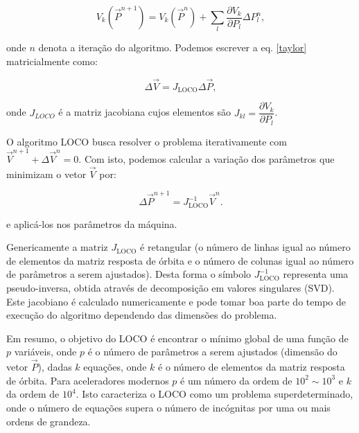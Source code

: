 \begin{equation}
V_{k}(\vec{P}^{n+1}) = V_{k}(\vec{P}^{n}) + \sum_{l}\dfrac{\partial V_{k}}{\partial P_{l}} \Delta P_{l}^{n},
\label{taylor}
\end{equation}

onde $n$ denota a iteração do algoritmo. Podemos escrever a eq. \eqref{taylor} matricialmente como:

\begin{equation}
    \Delta \vec{V}  = J_{\mathrm{LOCO}} \Delta \vec{P},
\end{equation}

onde $J_{LOCO}$ é a matriz jacobiana cujos elementos são $J_{kl} = \dfrac{\partial V_{k}}{\partial P_{l}}$.

O algoritmo LOCO busca resolver o problema iterativamente com $\vec{V}^{n+1} + \Delta \vec{V}^n = 0$. Com isto, podemos calcular a variação dos parâmetros que minimizam o vetor $\vec{V}$ por:

\begin{equation}
    \Delta \vec{P}^{n+1} = J_{\mathrm{LOCO}}^{-1} \vec{V}^{n}.
\end{equation}

e aplicá-los nos parâmetros da máquina. 

Genericamente a matriz $J_{\mathrm{LOCO}}$ é retangular (o número de linhas igual ao número de elementos da matriz resposta de órbita e o número de colunas igual ao número de parâmetros a serem ajustados). Desta forma o símbolo $J_{\mathrm{LOCO}}^{-1}$ representa uma pseudo-inversa, obtida através de decomposição em valores singulares (SVD). Este jacobiano é calculado numericamente e pode tomar boa parte do tempo de execução do algoritmo dependendo das dimensões do problema.

Em resumo, o objetivo do LOCO é encontrar o mínimo global de uma função de $p$ variáveis, onde $p$ é o número de parâmetros a serem ajustados (dimensão do vetor $\vec{P}$), dadas $k$ equações, onde $k$ é o número de elementos da matriz resposta de órbita. Para aceleradores modernos $p$ é um número da ordem de $10^{2} \sim 10^{3}$ e $k$ da ordem de $10^4$. Isto caracteriza o LOCO como um problema superdeterminado, onde o número de equações supera o número de incógnitas por uma ou mais ordens de grandeza.